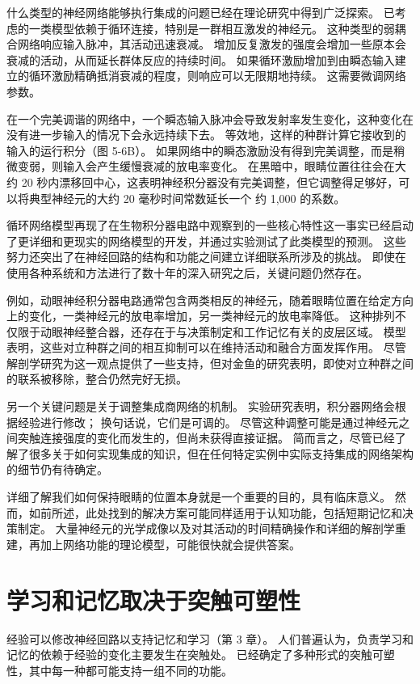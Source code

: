 什么类型的神经网络能够执行集成的问题已经在理论研究中得到广泛探索。 已考虑的一类模型依赖于循环连接，特别是一群相互激发的神经元。 这种类型的弱耦合网络响应输入脉冲，其活动迅速衰减。 增加反复激发的强度会增加一些原本会衰减的活动，从而延长群体反应的持续时间。 如果循环激励增加到由瞬态输入建立的循环激励精确抵消衰减的程度，则响应可以无限期地持续。 这需要微调网络参数。

在一个完美调谐的网络中，一个瞬态输入脉冲会导致发射率发生变化，这种变化在没有进一步输入的情况下会永远持续下去。 等效地，这样的种群计算它接收到的输入的运行积分（图 5-6B）。 如果网络中的瞬态激励没有得到完美调整，而是稍微变弱，则输入会产生缓慢衰减的放电率变化。 在黑暗中，眼睛位置往往会在大约 20 秒内漂移回中心，这表明神经积分器没有完美调整，但它调整得足够好，可以将典型神经元的大约 20 毫秒时间常数延长一个 约 1,000 的系数。

循环网络模型再现了在生物积分器电路中观察到的一些核心特性这一事实已经启动了更详细和更现实的网络模型的开发，并通过实验测试了此类模型的预测。 这些努力还突出了在神经回路的结构和功能之间建立详细联系所涉及的挑战。 即使在使用各种系统和方法进行了数十年的深入研究之后，关键问题仍然存在。

例如，动眼神经积分器电路通常包含两类相反的神经元，随着眼睛位置在给定方向上的变化，一类神经元的放电率增加，另一类神经元的放电率降低。 这种排列不仅限于动眼神经整合器，还存在于与决策制定和工作记忆有关的皮层区域。 模型表明，这些对立种群之间的相互抑制可以在维持活动和融合方面发挥作用。 尽管解剖学研究为这一观点提供了一些支持，但对金鱼的研究表明，即使对立种群之间的联系被移除，整合仍然完好无损。

另一个关键问题是关于调整集成商网络的机制。 实验研究表明，积分器网络会根据经验进行修改； 换句话说，它们是可调的。 尽管这种调整可能是通过神经元之间突触连接强度的变化而发生的，但尚未获得直接证据。 简而言之，尽管已经了解了很多关于如何实现集成的知识，但在任何特定实例中实际支持集成的网络架构的细节仍有待确定。

详细了解我们如何保持眼睛的位置本身就是一个重要的目的，具有临床意义。 然而，如前所述，此处找到的解决方案可能同样适用于认知功能，包括短期记忆和决策制定。 大量神经元的光学成像以及对其活动的时间精确操作和详细的解剖学重建，再加上网络功能的理论模型，可能很快就会提供答案。



\section{学习和记忆取决于突触可塑性}
经验可以修改神经回路以支持记忆和学习（第 3 章）。 人们普遍认为，负责学习和记忆的依赖于经验的变化主要发生在突触处。 已经确定了多种形式的突触可塑性，其中每一种都可能支持一组不同的功能。

